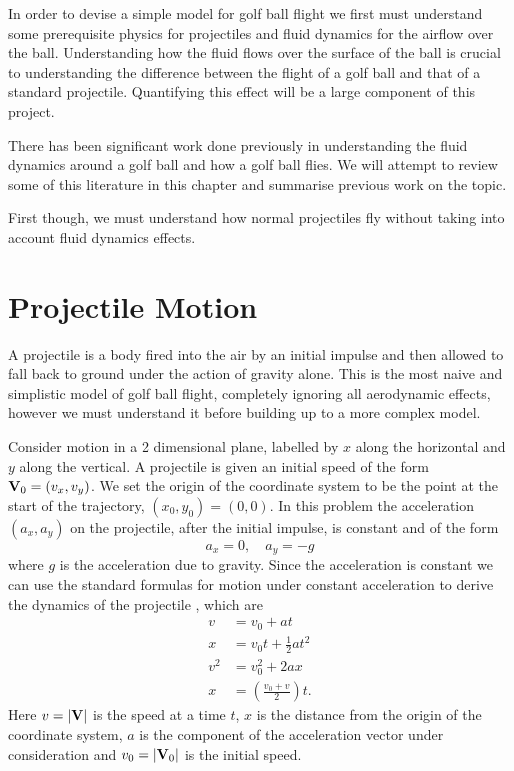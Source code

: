 In order to devise a simple model for golf ball flight we first must understand some
prerequisite physics for projectiles and fluid dynamics for the airflow over the ball. Understanding
how the fluid flows over the surface of the ball is crucial to understanding the difference between
the flight of a golf ball and that of a standard projectile. Quantifying this effect will be a large
component of this project.

There has been significant work done previously in understanding the fluid dynamics around a golf ball
and how a golf ball flies. We will attempt to review some of this literature in this chapter and summarise
previous work on the topic.

First though, we must understand how normal projectiles fly without taking into account fluid dynamics effects.
\section{Projectile Motion}
A projectile is a body fired into the air by an initial impulse and then allowed to fall back to ground under the
action of gravity alone. This is the most naive and simplistic model of golf ball flight, completely
ignoring all aerodynamic effects, however we must understand it before building up to a more
complex model.

Consider motion in a 2 dimensional plane, labelled by $x$ along the horizontal and $y$ along the vertical.
A projectile is given an initial speed of the form $\mathbf{V}_0 = (v_x, v_y)$. We set the origin of the coordinate system to be the point at the start of the
trajectory, $(x_0, y_0) = (0,0)$. In this problem the acceleration $(a_x,a_y)$ on the projectile, after the initial
impulse, is constant and of the form
\begin{equation} \label{grav}
a_x = 0, \quad a_y = -g
\end{equation}
where $g$ is the acceleration due to gravity. Since the acceleration is constant we can use
the standard formulas for motion under constant acceleration to derive the dynamics of the
projectile \citet{yandf}, which are
\begin{subequations} \label{suvat}
\begin{align}
v &= v_0 + at \label{v} \\
x &= v_0 t + \frac{1}{2} a t^2 \label{xsuvat} \\
v^2 &= v_0^2 + 2ax \\
x &= \left(\frac{v_0 + v}{2}\right) t .
\end{align}
\end{subequations}
Here $v = |\mathbf{V}|$ is the speed at a time $t$, $x$ is the distance from the origin of the coordinate system,
$a$ is the component of the acceleration vector under consideration and $v_0 = |\mathbf{V}_0|$ is the initial speed.

